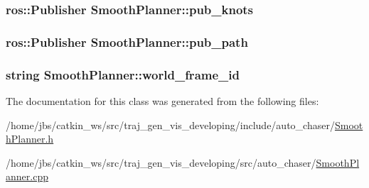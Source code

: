 \subsubsection[{\texorpdfstring{pub\+\_\+knots}{pub_knots}}]{\setlength{\rightskip}{0pt plus 5cm}ros\+::\+Publisher Smooth\+Planner\+::pub\+\_\+knots}\hypertarget{class_smooth_planner_a7ee67bceac6d60409542a2250b2ccd08}{}\label{class_smooth_planner_a7ee67bceac6d60409542a2250b2ccd08}
\subsubsection[{\texorpdfstring{pub\+\_\+path}{pub_path}}]{\setlength{\rightskip}{0pt plus 5cm}ros\+::\+Publisher Smooth\+Planner\+::pub\+\_\+path}\hypertarget{class_smooth_planner_a7b8400f711456291e567d0fc204c274b}{}\label{class_smooth_planner_a7b8400f711456291e567d0fc204c274b}
\subsubsection[{\texorpdfstring{world\+\_\+frame\+\_\+id}{world_frame_id}}]{\setlength{\rightskip}{0pt plus 5cm}string Smooth\+Planner\+::world\+\_\+frame\+\_\+id}\hypertarget{class_smooth_planner_ade278c4209b962d8342a2ee30e718c8b}{}\label{class_smooth_planner_ade278c4209b962d8342a2ee30e718c8b}


The documentation for this class was generated from the following files\+:\begin{DoxyCompactItemize}
\item 
/home/jbs/catkin\+\_\+ws/src/traj\+\_\+gen\+\_\+vis\+\_\+developing/include/auto\+\_\+chaser/\hyperlink{_smooth_planner_8h}{Smooth\+Planner.\+h}\item 
/home/jbs/catkin\+\_\+ws/src/traj\+\_\+gen\+\_\+vis\+\_\+developing/src/auto\+\_\+chaser/\hyperlink{_smooth_planner_8cpp}{Smooth\+Planner.\+cpp}\end{DoxyCompactItemize}
